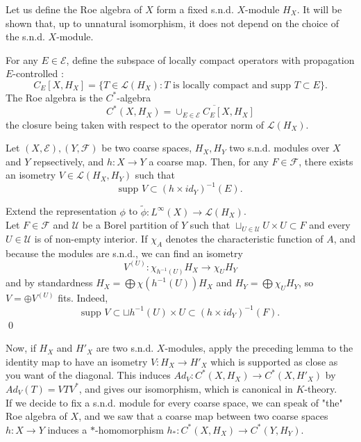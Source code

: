 Let us define the Roe algebra of $X$ form a fixed s.n.d. $X$-module $H_X$. It will be shown that, up to unnatural isomorphism, it does not depend on the choice of the s.n.d. $X$-module.\\

\begin{definition}
For any $E\in \mathcal E$, define the subspace of locally compact operators with propagation $E$-controlled :
\[C_E[X,H_X] = \{T\in\mathcal L(H_X) : T \text{ is locally compact and supp }T\subset E\}.\]
The Roe algebra is the $C^*$-algebra 
\[C^*(X,H_X) = \overline{\cup_{E\in\mathcal E} C_E[X,H_X]}\]
the closure being taken with respect to the operator norm of $\mathcal L(H_X)$.
\end{definition}

\begin{prop}
Let $(X,\mathcal E),(Y,\mathcal F)$ be two coarse spaces, $H_X,H_Y$ two s.n.d. modules over $X$ and $Y$ repsectively, and $h :X\rightarrow Y$ a coarse map. Then, for any $F\in \mathcal F$, there exists an isometry $V\in \mathcal L(H_X,H_Y)$ such that
\[\text{supp }V \subset (h\times id_Y)^{-1}(E).\]
\end{prop}

\begin{dem}
Extend the representation $\phi$ to $\tilde \phi : L^\infty (X)\rightarrow \mathcal L(H_X)$. \\

Let $F\in \mathcal F$ and $\mathcal U$ be a Borel partition of $Y$ such that $\sqcup_{U\in \mathcal U} U\times U \subset F$ and every $U\in \mathcal U$ is of non-empty interior. If $\chi_A$ denotes the characteristic function of $A$, and because the modules are s.n.d., we can find an isometry \[V^{(U)} :\chi_{h^{-1}(U)}H_X \rightarrow \chi_U H_Y\] 
and by standardness $H_X =\bigoplus \chi(h^{-1}(U)) H_X$ and $H_Y =\bigoplus \chi_U H_Y$, so $V = \oplus V^{(U)}$ fits. Indeed, 
\[\text{supp }V\subset \sqcup h^{-1}(U)\times U \subset (h\times id_Y)^{-1}(F).\] 
\qed
\end{dem}

Now, if $H_X$ and $H'_X$ are two s.n.d. $X$-modules, apply the preceding lemma to the identity map to have an isometry $V: H_X\rightarrow H'_X$ which is supported as close as you want of the diagonal. This induces $Ad_V : C^*(X,H_X)\rightarrow C^*(X,H'_X)$ by $Ad_V(T) = VTV^*$, and gives our isomorphism, which is canonical in $K$-theory. \\

If we decide to fix a s.n.d. module for every coarse space, we can speak of "the" Roe algebra of $X$, and we saw that a coarse map between two coarse spaces $h : X\rightarrow Y$ induces a $*$-homomorphism $h_* : C^*(X,H_X)\rightarrow C^*(Y,H_Y)$. \\

